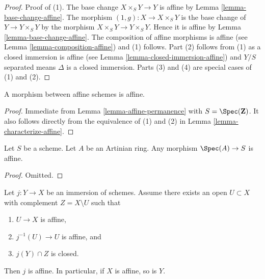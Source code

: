 \begin{proof}
Proof of (1). The base change $X \times_S Y \to Y$ is affine by
Lemma \ref{lemma-base-change-affine}.
The morphism $(1, g) : X \to X \times_S Y$ is the base change of
$Y \to Y \times_S Y$ by the morphism $X \times_S Y \to Y \times_S Y$.
Hence it is affine by
Lemma \ref{lemma-base-change-affine}.
The composition of affine morphisms is affine
(see Lemma \ref{lemma-composition-affine}) and (1) follows.
Part (2) follows from (1) as a closed immersion is affine
(see Lemma \ref{lemma-closed-immersion-affine}) and $Y/S$ separated
means $\Delta$ is a closed immersion. Parts (3) and (4) are special
cases of (1) and (2).
\end{proof}

\begin{lemma}
\label{lemma-morphism-affines-affine}
A morphism between affine schemes is affine.
\end{lemma}

\begin{proof}
Immediate from Lemma \ref{lemma-affine-permanence} with
$S = \Spec(\mathbf{Z})$. It also follows directly from the
equivalence of (1) and (2) in Lemma \ref{lemma-characterize-affine}.
\end{proof}

\begin{lemma}
\label{lemma-Artinian-affine}
Let $S$ be a scheme.
Let $A$ be an Artinian ring.
Any morphism $\Spec(A) \to S$ is affine.
\end{lemma}

\begin{proof}
Omitted.
\end{proof}

\begin{lemma}
\label{lemma-get-affine}
Let $j : Y \to X$ be an immersion of schemes.
Assume there exists an open $U \subset X$ with complement
$Z = X \setminus U$ such that
\begin{enumerate}
\item $U \to X$ is affine,
\item $j^{-1}(U) \to U$ is affine, and
\item $j(Y) \cap Z$ is closed.
\end{enumerate}
Then $j$ is affine. In particular, if $X$ is affine, so is $Y$.
\end{lemma}

